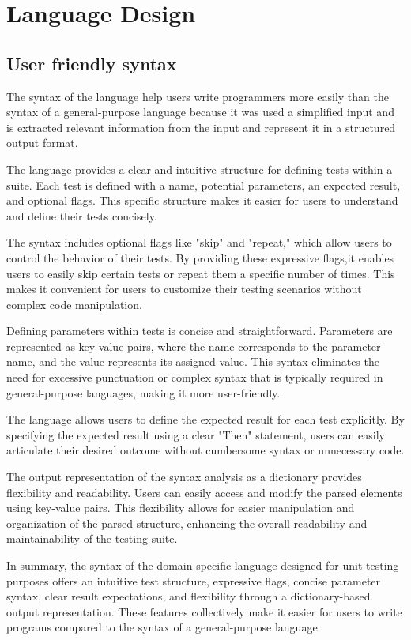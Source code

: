 \chapter{Language Design}


\section{User friendly syntax }
The syntax of the language help users write programmers more easily than the syntax of a general-purpose language because it was used a simplified input and is extracted relevant information from the input and represent it in a structured output format.  

The language provides a clear and intuitive structure for defining tests within a suite. Each test is defined with a name, potential parameters, an expected result, and optional flags. This specific structure makes it easier for users to understand and define their tests concisely.

The syntax includes optional flags like "skip" and "repeat," which allow users to control the behavior of their tests. By providing these expressive flags,it enables users to easily skip certain tests or repeat them a specific number of times. This makes it convenient for users to customize their testing scenarios without complex code manipulation.

Defining parameters within tests is concise and straightforward. Parameters are represented as key-value pairs, where the name corresponds to the parameter name, and the value represents its assigned value. This syntax eliminates the need for excessive punctuation or complex syntax that is typically required in general-purpose languages, making it more user-friendly.

The language allows users to define the expected result for each test explicitly. By specifying the expected result using a clear "Then" statement, users can easily articulate their desired outcome without cumbersome syntax or unnecessary code.

The output representation of the syntax analysis as a dictionary provides flexibility and readability. Users can easily access and modify the parsed elements using key-value pairs. This flexibility allows for easier manipulation and organization of the parsed structure, enhancing the overall readability and maintainability of the testing suite.

In summary, the syntax of the domain specific language designed for unit testing purposes offers an intuitive test structure, expressive flags, concise parameter syntax, clear result expectations, and flexibility through a dictionary-based output representation. These features collectively make it easier for users to write programs compared to the syntax of a general-purpose language.

